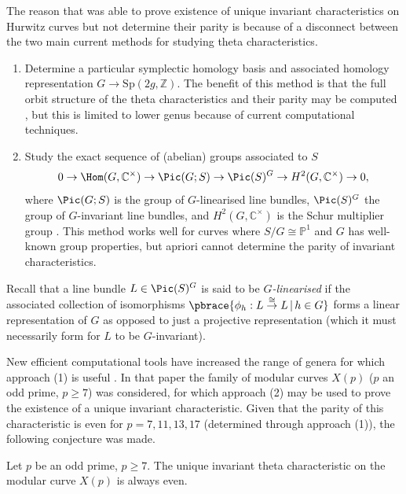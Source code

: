 \documentclass{amsart}
\begin{document}
The reason that \cite{Braden2025} was able to prove existence of unique invariant characteristics on Hurwitz curves but not determine their parity is because of a disconnect between the two main current methods for studying theta characteristics. 
\begin{enumerate}
    \item Determine a particular symplectic homology basis and associated homology representation $G \to \mathrm{Sp}(2g, \mathbb{Z})$. The benefit of this method is that the full orbit structure of the theta characteristics and their parity may be computed \cite{Kallel2010}, but this is limited to lower genus because of current computational techniques. 
    \item Study the exact sequence of (abelian) groups associated to $S$
    \begin{equation}\label{eq: general exact sequence}
    0 \to \Hom(G, \mathbb{C}^\times) \to \Pic(G; S) \to \Pic(S)^G \to H^2(G, \mathbb{C}^\times) \to 0,
    \end{equation}
    where $\Pic(G; S)$ is the group of $G$-linearised line bundles, $\Pic(S)^G$ the group of $G$-invariant line bundles, and $H^2(G, \mathbb{C}^\times)$ is the Schur multiplier group \cite{Dolgachev1997a}. This method works well for curves where $S/G \cong \mathbb{P}^1$ and $G$ has well-known group properties, but apriori cannot determine the parity of invariant characteristics. 
\end{enumerate}

\begin{remark}
    Recall that a line bundle $L \in \Pic(S)^G$ is said to be \textit{$G$-linearised} if the associated collection of isomorphisms $\pbrace{\phi_h : L \overset{\cong}{\to} L \, | \, h \in G}$ forms a linear representation of $G$ as opposed to just a projective representation (which it must necessarily form for $L$ to be $G$-invariant). 
\end{remark}


New efficient computational tools have increased the range of genera for which approach (1) is useful \cite{Broughton2026}. In that paper the family of modular curves $X(p)$ ($p$ an odd prime, $p \geq 7$) was considered, for which approach (2) may be used to prove the existence of a unique invariant characteristic. Given that the parity of this characteristic is even for $p=7, 11, 13, 17$ (determined through approach (1)), the following conjecture was made. 

\begin{conjecture}\label{conjecture}
    Let $p$ be an odd prime, $p\geq 7$. The unique invariant theta characteristic on the modular curve $X(p)$ is always even. 
\end{conjecture}
\end{document}
